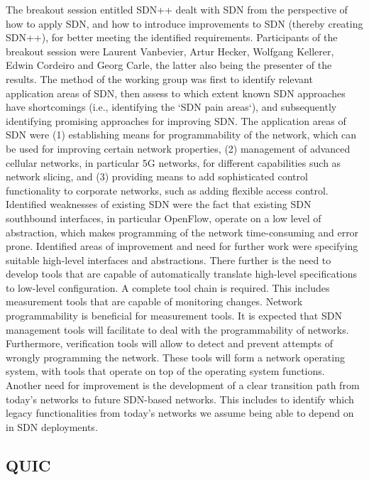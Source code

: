 The breakout session entitled SDN++ dealt with SDN from the perspective of how
to apply SDN, and how to introduce improvements to SDN (thereby creating
SDN++), for better meeting the identified requirements.  Participants of the
breakout session were Laurent Vanbevier, Artur Hecker, Wolfgang Kellerer,
Edwin Cordeiro and Georg Carle, the latter also being the presenter of the
results.  The method of the working group was first to identify relevant
application areas of SDN, then assess to which extent known SDN approaches
have shortcomings (i.e., identifying the `SDN pain areas`), and subsequently
identifying promising approaches for improving SDN.  The application areas of
SDN were (1) establishing means for programmability of the network, which can
be used for improving certain network properties, (2) management of advanced
cellular networks, in particular 5G networks, for different capabilities such
as network slicing, and (3) providing means to add sophisticated control
functionality to corporate networks, such as adding flexible access control.
Identified weaknesses of existing SDN were the fact that existing SDN
southbound interfaces, in particular OpenFlow, operate on a low level of
abstraction, which makes programming of the network time-consuming and error
prone.  Identified areas of improvement and need for further work were
specifying suitable high-level interfaces and abstractions.  There further is
the need to develop tools that are capable of automatically translate
high-level specifications to low-level configuration. A complete tool chain is
required.  This includes measurement tools that are capable of monitoring
changes. Network programmability is beneficial for measurement tools.  It is
expected that SDN management tools will facilitate to deal with the
programmability of networks.  Furthermore, verification tools will allow to
detect and prevent attempts of wrongly programming the network.    These tools
will form a network operating system, with tools that operate on top of the
operating system functions.  Another need for improvement is the development
of a clear transition path from today's networks to future SDN-based networks.
This includes to identify which legacy functionalities from today's networks
we assume being able to depend on in SDN deployments.



\subsection{QUIC}


